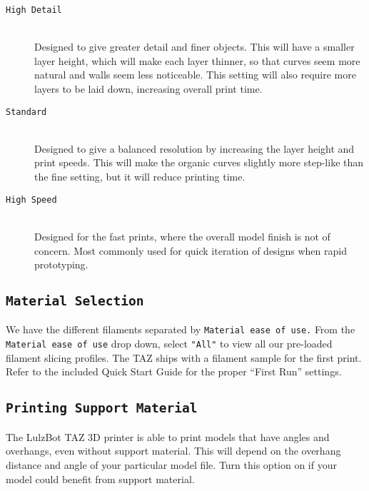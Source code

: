 \begin{description}
\item[\texttt{High Detail}] \hfill \\
Designed to give greater detail and finer objects. This will have a smaller layer height, which will make each layer thinner, so that curves seem more natural and walls seem less noticeable. This setting will also require more layers to be laid down, increasing overall print time.

\item[\texttt{Standard}] \hfill \\
Designed to give a balanced resolution by increasing the layer height and print speeds. This will make the organic curves slightly more step-like than the fine setting, but it will reduce printing time.

\item[\texttt{High Speed}] \hfill \\
Designed for the fast prints, where the overall model finish is not of concern. Most commonly used for quick iteration of designs when rapid prototyping.
\end{description}

\subsection{\texttt{Material Selection}}
We have the different filaments separated by \texttt{Material ease of use.} From the \texttt{Material ease of use} drop down, select \texttt{"All"} to view all our pre-loaded filament slicing profiles. The TAZ ships with a filament sample for the first print. Refer to the included Quick Start Guide for the proper ``First Run'' settings.

\subsection{\texttt{Printing Support Material}}
The LulzBot TAZ 3D printer is able to print models that have angles and overhangs, even without support material. This will depend on the overhang distance and angle of your particular model file. Turn this option on if your model could benefit from support material.

